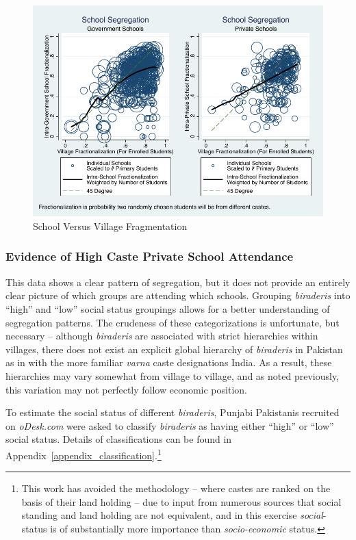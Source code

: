 \documentclass[Eubank_pk_ethnic_sorting.tex]{subfiles}
\begin{document}
\begin{figure}[H]
	\begin{center}
	\caption{School Versus Village Fragmentation}\label{schoolvvillageherf}
	\includegraphics[scale=1.0]{../results/intra_versus_intervillage_frac_combined.pdf}
	\end{center}
\end{figure}



\subsubsection{Evidence of High Caste Private School Attendance}

This data shows a clear pattern of segregation, but it does not provide an entirely clear picture of which groups are attending which schools.  Grouping \emph{biraderis} into ``high'' and ``low'' social status groupings allows for a better understanding of segregation patterns. The crudeness of these categorizations is unfortunate, but necessary -- although \emph{biraderis} are associated with strict hierarchies within villages, there does not exist an explicit global hierarchy of \emph{biraderis} in Pakistan as in with the more familiar \emph{varna} caste designations India. As a result, these hierarchies may vary somewhat from village to village, and as noted previously, this variation may not perfectly follow economic position.

To estimate the social status of different \emph{biraderis}, Punjabi Pakistanis recruited on \emph{oDesk.com} were asked to classify \emph{biraderis} as having either ``high'' or ``low'' social status. Details of classifications can be found in Appendix~\ref{appendix_classification}.\footnote{This work has avoided the \cite{Jacoby:2011tc} methodology -- where castes are ranked on the basis of their land holding -- due to input from numerous sources that social standing and land holding are not equivalent, and in this exercise \emph{social}-status is of substantially more importance than \emph{socio-economic} status.}
\end{document}
